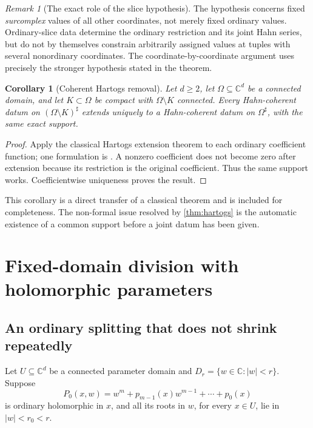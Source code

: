 \documentclass[11pt,oneside]{article}
\numberwithin{equation}{section}
\newtheorem{corollary}[theorem]{Corollary}
\theoremstyle{definition}
\theoremstyle{remark}\newtheorem{remark}[theorem]{Remark}
\newcommand{\C}{\mathbb C}
\newcommand{\sh}{^{\sharp}}
\begin{document}
\begin{remark}[The exact role of the slice hypothesis]
The hypothesis concerns fixed \emph{surcomplex} values of all other coordinates, not merely fixed ordinary values. Ordinary-slice data determine the ordinary restriction and its joint Hahn series, but do not by themselves constrain arbitrarily assigned values at tuples with several nonordinary coordinates. The coordinate-by-coordinate argument uses precisely the stronger hypothesis stated in the theorem.
\end{remark}

\begin{corollary}[Coherent Hartogs removal]\label{cor:hole}
Let \(d\geq2\), let \(\Omega\subseteq\C^d\) be a connected domain, and let \(K\subset\Omega\) be compact with \(\Omega\setminus K\) connected. Every Hahn-coherent datum on \((\Omega\setminus K)\sh\) extends uniquely to a Hahn-coherent datum on \(\Omega\sh\), with the same exact support.
\end{corollary}
\begin{proof}
Apply the classical Hartogs extension theorem to each ordinary coefficient function; one formulation is \cite[Theorem 4.3.1]{Lebl}. A nonzero coefficient does not become zero after extension because its restriction is the original coefficient. Thus the same support works. Coefficientwise uniqueness proves the result.
\end{proof}
This corollary is a direct transfer of a classical theorem and is included for completeness. The non-formal issue resolved by \cref{thm:hartogs} is the automatic existence of a common support before a joint datum has been given.

\section{Fixed-domain division with holomorphic parameters}\label{sec:division}
\subsection{An ordinary splitting that does not shrink repeatedly}
Let \(U\subseteq\C^d\) be a connected parameter domain and \(D_r=\{w\in\C:|w|<r\}\). Suppose
\[
 P_0(x,w)=w^m+p_{m-1}(x)w^{m-1}+\cdots+p_0(x)
\]
is ordinary holomorphic in \(x\), and all its roots in \(w\), for every \(x\in U\), lie in \(|w|<r_0<r\).
\end{document}
